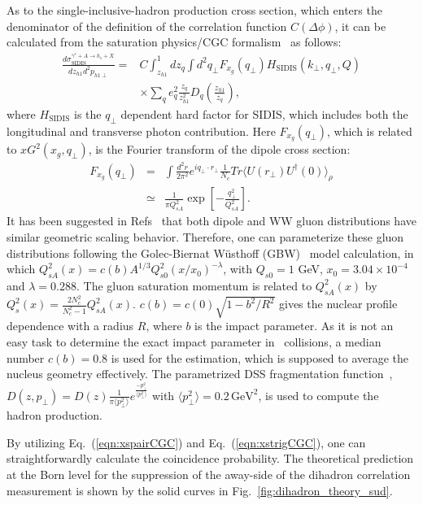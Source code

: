 As to the single-inclusive-hadron production cross section, which enters the
denominator of the definition of the correlation function $C(\Delta\phi)$, it
can be calculated from the saturation physics/CGC formalism~\cite{Marquet:2009ca} as
follows:
\begin{eqnarray}\label{eqn:xstrigCGC}
\frac{d\sigma^{\gamma^{*}+A\rightarrow h_{1}+X}_{\textrm{SIDIS}}}{dz_{h1}d^{2}p_{h1\perp}} 
= & C \int^{1}_{z_{h1}}dz_{q} \int
d^{2}q_{\perp}F_{x_{g}}(q_{\perp})H_{\textrm{SIDIS}}(k_{\perp},q_{\perp},Q) \\ \nonumber
  & \times \sum_{q} e^{2}_{q}\frac{z_{q}}{z^{2}_{h1}}D_{q}(\frac{z_{h1}}{z_{q}}),
\end{eqnarray}
where $H_{\textrm{SIDIS}}$ is the $q_{\perp}$ dependent hard factor for SIDIS,
which includes both the longitudinal and transverse photon contribution. Here
$F_{x_{g}}(q_\perp)$, which is related to $xG^{2}(x_g,q_\perp)$, is the Fourier
transform of the dipole cross section:
\begin{eqnarray}
F_{x_{g}}(q_{\perp})& = &\int \frac{d^{2}r}{2\pi^{2}}e^{iq_{\perp}\cdot
r_{\perp}} \frac{1}{N_{c}} Tr\langle
U(r_{\perp})U^{\dag}(0)\rangle_{\rho} \\ \nonumber
& \simeq &\frac{1}{\pi
Q^{2}_{sA}}\exp[-\frac{q_{\perp}^{2}}{Q^{2}_{sA}}]. 
\end{eqnarray}
It has been suggested in Refs~\cite{Dominguez:2011gc, Dumitru:2011vk} that both
dipole and WW gluon distributions have similar geometric scaling behavior.
Therefore, one can parameterize these gluon distributions following the
Golec-Biernat W\"{u}sthoff (GBW)~\cite{GolecBiernat:1998js} model calculation, in
which $Q^{2}_{sA}(x)=c(b)A^{1/3}Q^{2}_{s0}(x/x_{0})^{-\lambda}$, with $Q_{s0}=1$
GeV, $x_{0}=3.04\times 10^{-4}$ and  $\lambda=0.288$. The gluon saturation
momentum is related to $Q^{2}_{sA}(x)$ by
$Q_s^2(x)=\frac{2N_c^2}{N_c^2-1}Q^{2}_{sA}(x)$. $c(b)=c(0)\sqrt{1-b^{2}/R^{2}}$
gives the nuclear profile dependence with a radius $R$, where $b$ is the impact
parameter. As it is not an easy task to determine the exact impact parameter in \eA\
collisions, a median number $c(b)=0.8$ is used for the estimation,
which is supposed to average the nucleus geometry effectively. The parametrized
DSS fragmentation function~\cite{deFlorian:2007aj},
$D(z,p_{\perp})=D(z)\frac{1}{\pi\langle
p^{2}_{\perp}\rangle}e^{\frac{-p_{\perp}^{2}}{\langle p^{2}_{\perp}\rangle}}$ with
$\langle p^{2}_{\perp}\rangle=0.2 \, \mathrm{GeV}^{2}$, is used to compute the hadron
production.

By utilizing Eq.~(\ref{eqn:xspairCGC}) and Eq.~(\ref{eqn:xstrigCGC}), one can
straightforwardly calculate the coincidence probability. The theoretical
prediction at the Born level for the suppression of the away-side of the
dihadron correlation measurement is shown by the solid curves in
Fig.~\ref{fig:dihadron_theory_sud}.


